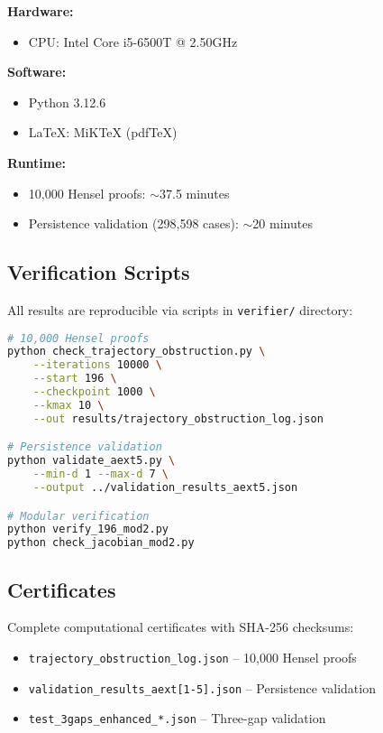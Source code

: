 \documentclass[11pt,a4paper]{article}
\theoremstyle{plain}
\theoremstyle{definition}
\begin{document}
\textbf{Hardware:}
\begin{itemize}
\item CPU: Intel Core i5-6500T @ 2.50GHz
\end{itemize}

\textbf{Software:}
\begin{itemize}
\item Python 3.12.6
\item LaTeX: MiKTeX (pdfTeX)
\end{itemize}

\textbf{Runtime:}
\begin{itemize}
\item 10,000 Hensel proofs: $\sim$37.5 minutes
\item Persistence validation (298,598 cases): $\sim$20 minutes
\end{itemize}

\subsection{Verification Scripts}

All results are reproducible via scripts in \texttt{verifier/} directory:

\begin{lstlisting}[language=bash]
# 10,000 Hensel proofs
python check_trajectory_obstruction.py \
    --iterations 10000 \
    --start 196 \
    --checkpoint 1000 \
    --kmax 10 \
    --out results/trajectory_obstruction_log.json

# Persistence validation
python validate_aext5.py \
    --min-d 1 --max-d 7 \
    --output ../validation_results_aext5.json

# Modular verification
python verify_196_mod2.py
python check_jacobian_mod2.py
\end{lstlisting}

\subsection{Certificates}

Complete computational certificates with SHA-256 checksums:
\begin{itemize}
\item \texttt{trajectory\_obstruction\_log.json} -- 10,000 Hensel proofs
\item \texttt{validation\_results\_aext[1-5].json} -- Persistence validation
\item \texttt{test\_3gaps\_enhanced\_*.json} -- Three-gap validation
\end{itemize}
\end{document}
